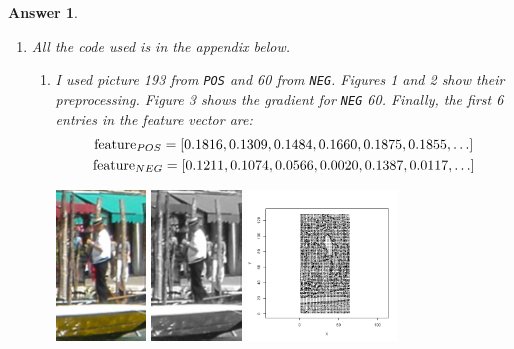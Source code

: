 \documentclass[12pt]{article}
\theoremstyle{colon}
\newtheorem*{answer}{Answer}
\begin{document}
\begin{answer}
  \leavevmode
  \begin{enumerate}[label=\arabic*)]
    \item All the code used is in the appendix below.
      \begin{enumerate}[label=\alph*)]
        \item I used picture 193 from \texttt{POS} and 60 from \texttt{NEG}. Figures 1 and 2 show their preprocessing. Figure 3 shows the gradient for \texttt{NEG} 60. Finally, the first 6 entries in the feature vector are:
          \begin{gather*}
            \text{feature}_{POS} = [0.1816, 0.1309, 0.1484, 0.1660, 0.1875, 0.1855, \mathellipsis] \\
            \text{feature}_{NEG} = [0.1211, 0.1074, 0.0566, 0.0020, 0.1387, 0.0117, \mathellipsis]
          \end{gather*}

          \begin{center}
            \includegraphics[height=4cm]{193.png}
            \includegraphics[height=4cm]{grey_193.png}
            \includegraphics[height=4cm]{grad_193.png}
          \end{center}


\end{enumerate}
\end{enumerate}
\end{answer}
\end{document}
